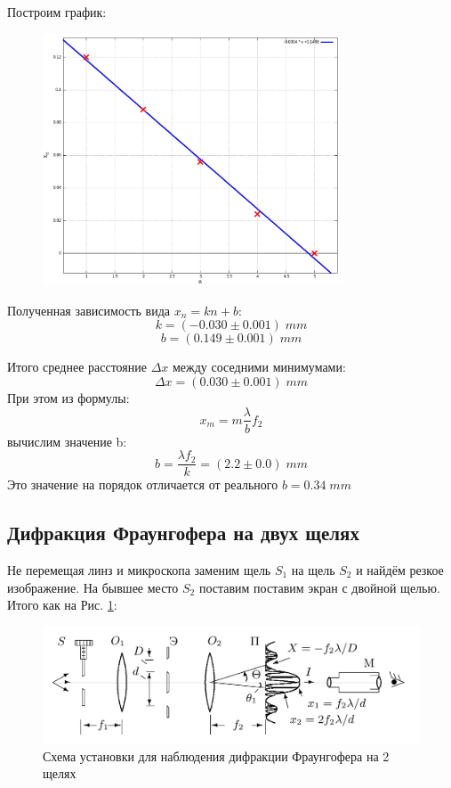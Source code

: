 \documentclass{article}
\begin{document}
Построим график:
\begin{figure}[H]
  \centering
  \includegraphics[width=0.8\textwidth]{fgfr.png}
\end{figure}
Полученная зависимость вида \(x_n = kn + b\):
\[ k = (-0.030 \pm 0.001)\;mm \]
\[ b = (0.149 \pm 0.001)\;mm \]

Итого среднее расстояние \(\Delta x\) между соседними минимумами:
\[ \Delta x = (0.030 \pm 0.001)\; mm \]
При этом из формулы:
\[ x_m = m \frac{\lambda}{b}f_2 \]
вычислим значение b:
\[ b = \frac{\lambda f_2}{k} = (2.2 \pm 0.0)\;mm\]
Это значение на порядок отличается от реального \(b = 0.34\;mm\)

\subsection{Дифракция Фраунгофера на двух щелях}
Не перемещая линз и микроскопа заменим щель \(S_1\) на щель \(S_2\) и найдём резкое изображение.
На бывшее место \(S_2\) поставим поставим экран с двойной щелью. Итого как на Рис. \ref{fig:fgfr2}:
\begin{figure}[H]
  \centering
  \includegraphics[width=\textwidth]{fgfr-scheme-2.png}
  \caption{Схема установки для наблюдения дифракции Фраунгофера на 2 щелях}
  \label{fig:fgfr2}
\end{figure}
\end{document}
